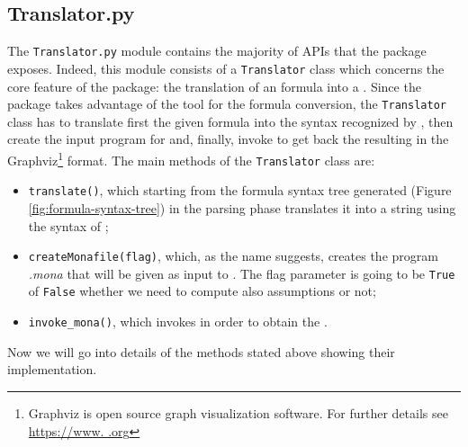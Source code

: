 \subsection{Translator.py}
The \texttt{Translator.py} module contains the majority of APIs that the \LTLfToDFA package exposes. Indeed, this module consists of a \texttt{Translator} class which concerns the core feature of the package: the translation of an \LTLf  formula into a \DFA. Since the package takes advantage of the \MONA tool for the formula conversion, the \texttt{Translator} class has to translate first the given formula into the syntax recognized by \MONA, then create the input program for \MONA and, finally, invoke \MONA to get back the resulting \DFA in the Graphviz\footnote{Graphviz is open source graph visualization software. For further details see \href{https://www.graphviz.org}{https://www.  .org}} format. 
The main methods of the \texttt{Translator} class are:
\begin{itemize}
\item \texttt{translate()}, which starting from the formula syntax tree generated (Figure \ref{fig:formula-syntax-tree}) in the parsing phase translates it into a string using the syntax of \MONA;
\item \texttt{createMonafile(flag)}, which, as the name suggests, creates the program \textit{.mona} that will be given as input to \MONA. The flag parameter is going to be \texttt{True} of \texttt{False} whether we need to compute also \declare  assumptions or not;
\item \texttt{invoke\_mona()}, which invokes \MONA in order to obtain the \DFA.
\end{itemize}
Now we will go into details of the methods stated above showing their implementation.
